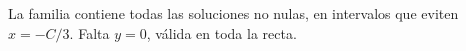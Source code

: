 La familia contiene todas las soluciones no nulas, en intervalos que eviten $x=-C/3$. Falta $y=0$, válida en toda la recta.
